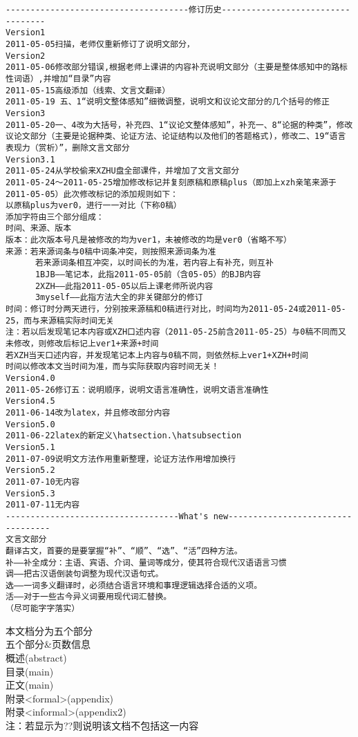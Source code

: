 \begin{verbatim}
-------------------------------------修订历史----------------------------------
Version1
2011-05-05扫描，老师仅重新修订了说明文部分，
Version2
2011-05-06修改部分错误,根据老师上课讲的内容补充说明文部分（主要是整体感知中的路标性词语）,并增加“目录”内容
2011-05-15高级添加（线索、文言文翻译）
2011-05-19 五、1“说明文整体感知”细微调整，说明文和议论文部分的几个括号的修正
Version3
2011-05-20一、4改为大括号，补充四、1“议论文整体感知”，补充一、8“论据的种类”，修改议论文部分（主要是论据种类、论证方法、论证结构以及他们的答题格式)，修改二、19“语言表现力（赏析）”，删除文言文部分
Version3.1
2011-05-24从学校偷来XZHU盘全部课件，并增加了文言文部分
2011-05-24～2011-05-25增加修改标记并复刻原稿和原稿plus（即加上xzh亲笔来源于2011-05-05）此次修改标记的添加规则如下：
以原稿plus为ver0，进行一一对比（下称0稿）
添加字符由三个部分组成：
时间、来源、版本
版本：此次版本号凡是被修改的均为ver1，未被修改的均是ver0（省略不写）
来源：若来源词条与0稿中词条冲突，则按照来源词条为准
      若来源词条相互冲突，以时间长的为准，若内容上有补充，则互补
      1BJB——笔记本，此指2011-05-05前（含05-05）的BJB内容
      2XZH——此指2011-05-05以后上课老师所说内容
      3myself——此指方法大全的非关键部分的修订
时间：修订时分两天进行，分别按来源稿和0稿进行对比，时间均为2011-05-24或2011-05-25，而与来源稿实际时间无关
注：若以后发现笔记本内容或XZH口述内容（2011-05-25前含2011-05-25）与0稿不同而又未修改，则修改后标记上ver1+来源+时间
若XZH当天口述内容，并发现笔记本上内容与0稿不同，则依然标上ver1+XZH+时间
时间以修改本文当时间为准，而与实际获取内容时间无关！
Version4.0
2011-05-26修订五：说明顺序，说明文语言准确性，说明文语言准确性
Version4.5
2011-06-14改为latex，并且修改部分内容
Version5.0
2011-06-22latex的新定义\hatsection.\hatsubsection
Version5.1
2011-07-09说明文方法作用重新整理，论证方法作用增加换行
Version5.2
2011-07-10无内容
Version5.3
2011-07-11无内容
-----------------------------------What's new----------------------------------
文言文部分
翻译古文，首要的是要掌握“补”、“顺”、“选”、“活”四种方法。
补——补全成分：主语、宾语、介词、量词等成分，使其符合现代汉语语言习惯
调——把古汉语倒装句调整为现代汉语句式。
选——一词多义翻译时，必须结合语言环境和事理逻辑选择合适的义项。
活——对于一些古今异义词要用现代词汇替换。
（尽可能字字落实）
\end{verbatim}
本文档分为五个部分\\
五个部分\&页数信息\\
概述(abstract)\pageref{abstract}\\
目录(main)\pageref{contents}\\
正文(main)\pageref{main}\\
附录<formal>(appendix)\pageref{appendixformal}\\
附录<informal>(appendix2)\pageref{appendix}\\

注：若显示为??则说明该文档不包括这一内容\label{appendixformal}


